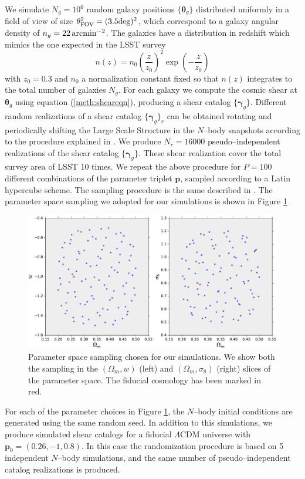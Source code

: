 \documentclass[reprint,aps,prd,superscriptaddress,showkeys,showpacs]{revtex4-1}
\newcommand{\bb}[1]{\mathbf{#1}}
\begin{document}
We simulate $N_g = 10^6$ random galaxy positions $\{\pmb{\theta}_g\}$ distributed uniformly in a field of view of size $\theta_{\rm FOV}^2=(3.5{\rm deg})^2$, which correspond to a galaxy angular density of $n_g=22\,\rm{arcmin}^{-2}$. The galaxies have a distribution in redshift which mimics the one expected in the LSST survey
\begin{equation}
\label{meth:galdistr}
n(z) = n_0\left(\frac{z}{z_0}\right)^2\exp\left(-\frac{z}{z_0}\right)
\end{equation}  
%
with $z_0=0.3$ and $n_0$ a normalization constant fixed so that $n(z)$ integrates to the total number of galaxies $N_g$. For each galaxy we compute the cosmic shear at $\pmb{\theta}_g$ using equation (\ref{meth:sheareqn}), producing a shear catalog $\{\pmb{\gamma}_g\}$. Different random realizations of a shear catalog $\{\pmb{\gamma}_g\}_r$ can be obtained rotating and periodically shifting the Large Scale Structure in the $N$--body snapshots according to the procedure explained in \citep{PetriVariance}. We produce $N_r=16000$ pseudo--independent realizations of the shear catalog $\{\pmb{\gamma}_g\}$. These shear realization cover the total survey area of LSST 10 times.
We repeat the above procedure for $P=100$ different combinations of the parameter triplet $\bb{p}$, sampled according to a Latin hypercube scheme. The sampling procedure is the same described in \citep{CFHTMink,CFHTPeaks}. The parameter space sampling we adopted for our simulations is shown in Figure \ref{fig:simdesign}

\begin{figure}
\includegraphics[scale=0.4]{Figures/design.eps}
\caption{Parameter space sampling chosen for our simulations. We show both the sampling in the $(\Omega_m,w)$ (left) and $(\Omega_m,\sigma_8)$ (right) slices of the parameter space. The fiducial cosmology has been marked in red.}
\label{fig:simdesign}
\end{figure}
%
For each of the parameter choices in Figure \ref{fig:simdesign}, the $N$--body initial conditions are generated using the same random seed. In addition to this simulations, we produce simulated shear catalogs for a fiducial $\Lambda$CDM universe with $\bb{p}_0=(0.26,-1,0.8)$. In this case the randomization procedure is based on 5 independent $N$--body simulations, and the same number of pseudo--independent catalog realizations is produced.    
\end{document}
